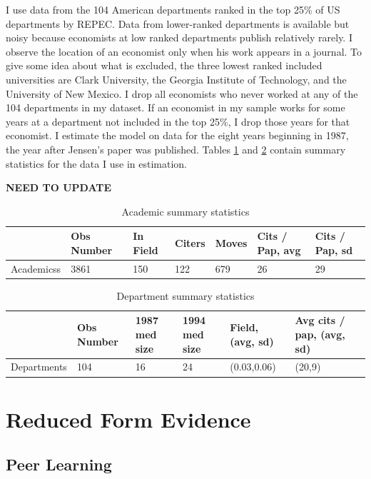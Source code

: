 \documentclass[]{article}
\begin{document}
I use data from the 104 American departments ranked in the top 25\% of
US departments by REPEC. Data from lower-ranked departments is
available but noisy because economists at low ranked departments
publish relatively rarely. I observe the location of an economist
only when his work appears in a journal. To give some idea about what is
excluded, the three lowest ranked included universities are Clark
University, the Georgia Institute of Technology, and the University of
New Mexico. I drop all economists who never worked at any of the 104 departments 
in my dataset.  If an economist in my sample works for some years at a
department not included in the top 25\%, I drop those years for that economist. I estimate the model on data for the eight years beginning
in 1987, the year after Jensen's paper was published. Tables \ref{tab:aut_sum}
and \ref{tab:dep_sum} contain summary statistics for the data I use in
estimation.

\textbf{NEED TO UPDATE}

\begin{table}[h!]
    \centering
    \begin{tabular}{|l|l|l|l|l|l|l|}
        \hline
                 & Obs Number & In Field & Citers & Moves & Cits / Pap, avg & Cits / Pap, sd \\ \hline
        Academicss  & 3861       & 150      & 122    & 679   & 26              & 29             \\ \hline
    \end{tabular}
    \caption{Academic summary statistics}
    \label{tab:aut_sum}
\end{table}

\begin{table}[h!]
    \centering
    \begin{tabular}{|l|l|l|l|l|l|l|}
        \hline
                    & Obs Number & 1987 med size & 1994 med size & Field, (avg, sd) & Avg cits / pap, (avg, sd) \\ \hline
        Departments & 104        & 16               & 24               & (0.03,0.06)           & (20,9) \\ \hline
    \end{tabular}
    \caption{Department summary statistics}
    \label{tab:dep_sum}
\end{table}

\section{Reduced Form Evidence}
\subsection{Peer Learning}
\end{document}
